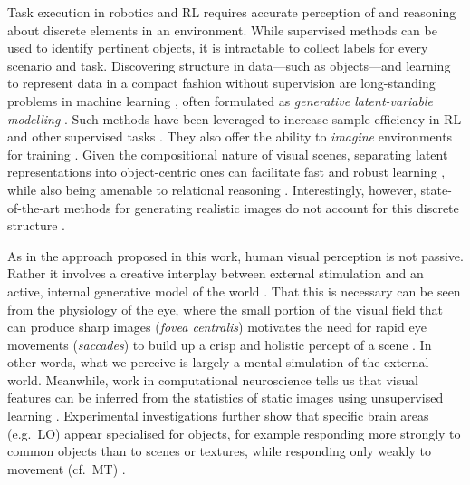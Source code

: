 \documentclass{article}
\begin{document}
Task execution in robotics and \gls{RL} requires accurate perception of and reasoning about discrete elements in an environment.
While supervised methods can be used to identify pertinent objects, it is intractable to collect labels for every scenario and task.
Discovering structure in data---such as objects---and learning to represent data in a compact fashion without supervision are long-standing problems in machine learning \citep{Comon1992ica,Tishby2000ib}, often formulated as \emph{generative latent-variable modelling} \citep[e.g.][]{kingma2013auto,rezende2014stochastic}.
Such methods have been leveraged to increase sample efficiency in \gls{RL} \citep{gregor2019shaping} and other supervised tasks \citep{steenkiste2019disentangle}.
They also offer the ability to \emph{imagine} environments for training \citep{ha2018world}.
Given the compositional nature of visual scenes, separating latent representations into object-centric ones can facilitate fast and robust learning \citep{watters2019cobra}, while also being amenable to relational reasoning \citep{Santoro2017relnet}.
Interestingly, however, state-of-the-art methods for generating realistic images do not account for this discrete structure \citep{brock2018large,parmar2018image}.

As in the approach proposed in this work, human visual perception is not passive. Rather it involves a creative interplay between external stimulation and an active, internal {generative model} of the world \citep{Rao_1999, Friston_2005}.
That this is necessary can be seen from the physiology of the eye, where the small portion of the visual field that can produce sharp images (\emph{fovea centralis}) motivates the need for rapid eye movements (\emph{saccades}) to build up a crisp and holistic percept of a scene \citep{Wandell_1995}. 
In other words, what we perceive is largely a mental simulation of the external world. 
Meanwhile, work in computational neuroscience tells us that visual features \citep[see, e.g.,][]{Hubel_1968} can be inferred from the statistics of static images using {unsupervised learning} \citep{Olshausen_1996}. 
Experimental investigations further show that specific brain areas (e.g.~LO) appear specialised for {objects}, for example responding more strongly to common objects than to scenes or textures, while responding only weakly to movement (cf.~MT) \citep[e.g.,][]{Grill_Spector_2004}. 
\end{document}

